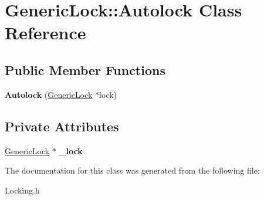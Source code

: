 \hypertarget{class_generic_lock_1_1_autolock}{}\section{Generic\+Lock\+:\+:Autolock Class Reference}
\label{class_generic_lock_1_1_autolock}
\subsection*{Public Member Functions}
\begin{DoxyCompactItemize}
\item 
\mbox{\label{class_generic_lock_1_1_autolock_a13d8fd8753758af8d01e70769223f040}} 
{\bfseries Autolock} (\hyperlink{class_generic_lock}{Generic\+Lock} $\ast$lock)
\end{DoxyCompactItemize}
\subsection*{Private Attributes}
\begin{DoxyCompactItemize}
\item 
\mbox{\label{class_generic_lock_1_1_autolock_af6542b5858c621e3e3425a4b5bf089dd}} 
\hyperlink{class_generic_lock}{Generic\+Lock} $\ast$ {\bfseries \+\_\+lock}
\end{DoxyCompactItemize}


The documentation for this class was generated from the following file\+:\begin{DoxyCompactItemize}
\item 
Locking.\+h\end{DoxyCompactItemize}
